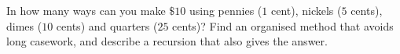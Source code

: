 In how many ways can you make $\$10$ using pennies ($1$ cent), nickels ($5$ cents), dimes ($10$ cents) and quarters ($25$ cents)? Find an organised method that avoids long casework, and describe a recursion that also gives the answer.
